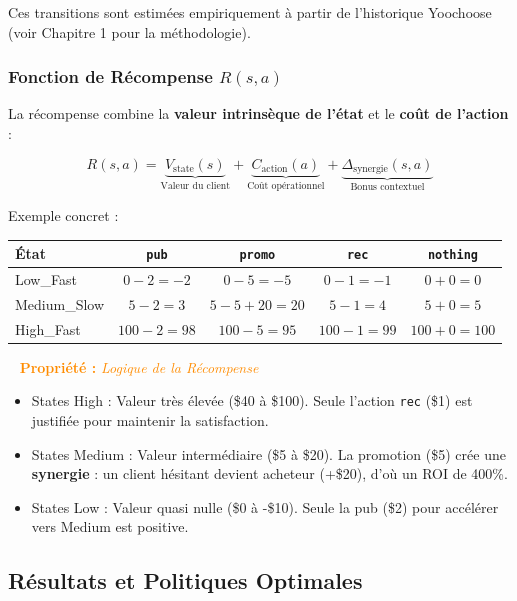 \documentclass[11pt,a4paper]{article}
\newenvironment{propbox}[1]{%
  \vspace{3pt}\begin{framed}
  \noindent{\color{DarkOrange}\rule{0.3cm}{3pt}}~%
  \textcolor{DarkOrange}{\textbf{Propriété :} \textit{#1}}\\[3pt]}
  {\end{framed}\vspace{3pt}}
\begin{document}
Ces transitions sont estimées empiriquement à partir de l'historique Yoochoose (voir Chapitre 1 pour la méthodologie).

\subsubsection{Fonction de Récompense $R(s, a)$}

La récompense combine la \textbf{valeur intrinsèque de l'état} et le \textbf{coût de l'action} :

$$R(s, a) = \underbrace{V_{\text{state}}(s)}_{\text{Valeur du client}} + \underbrace{C_{\text{action}}(a)}_{\text{Coût opérationnel}} + \underbrace{\Delta_{\text{synergie}}(s, a)}_{\text{Bonus contextuel}}$$

Exemple concret :

\begin{center}
\begin{tabularx}{\linewidth}{|l|c|c|c|c|}
\hline
\textbf{État} & \texttt{pub} & \texttt{promo} & \texttt{rec} & \texttt{nothing} \\
\hline
Low\_Fast & $0 - 2 = -2$ & $0 - 5 = -5$ & $0 - 1 = -1$ & $0 + 0 = 0$ \\
Medium\_Slow & $5 - 2 = 3$ & $5 - 5 + 20 = 20$ & $5 - 1 = 4$ & $5 + 0 = 5$ \\
High\_Fast & $100 - 2 = 98$ & $100 - 5 = 95$ & $100 - 1 = 99$ & $100 + 0 = 100$ \\
\hline
\end{tabularx}
\end{center}

\begin{propbox}{Logique de la Récompense}
\begin{itemize}
  \item States High : Valeur très élevée (\$40 à \$100). Seule l'action \texttt{rec} (\$1) est justifiée pour maintenir la satisfaction.
  \item States Medium : Valeur intermédiaire (\$5 à \$20). La promotion (\$5) crée une \textbf{synergie} : un client hésitant devient acheteur (+\$20), d'où un ROI de 400\%.
  \item States Low : Valeur quasi nulle (\$0 à -\$10). Seule la pub (\$2) pour accélérer vers Medium est positive.
\end{itemize}
\end{propbox}

\subsection{Résultats et Politiques Optimales}
\end{document}
